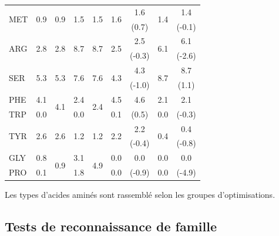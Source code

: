 \begin{table}
\begin{tabular}{lcccc|cccc}
\hline                                                                        
\multirow{2}{*}{MET}&\multirow{2}{*}{0.9}&\multirow{2}{*}{0.9}&\multirow{2}{*}{1.5}&\multirow{2}{*}{1.5}&\multirow{2}{*}{1.6}&1.6&\multirow{2}{*}{1.4}&1.4\\
&&&&&&(0.7)&&(-0.1)\\
\hline                                                                         
\multirow{2}{*}{ARG}&\multirow{2}{*}{2.8}&\multirow{2}{*}{2.8}&\multirow{2}{*}{8.7}&\multirow{2}{*}{8.7}&\multirow{2}{*}{2.5}&2.5&\multirow{2}{*}{6.1}&6.1\\
&&&&&&(-0.3)&&(-2.6)\\
\hline                                                                                  
\multirow{2}{*}{SER} &\multirow{2}{*}{5.3}&\multirow{2}{*}{5.3}&\multirow{2}{*}{7.6}&\multirow{2}{*}{7.6}&\multirow{2}{*}{4.3}&4.3&\multirow{2}{*}{8.7}&8.7\\
&&&&&&(-1.0)&&(1.1)\\
\hline                                                         
PHE      &4.1&\multirow{2}{*}{4.1}&2.4&\multirow{2}{*}{2.4}&4.5&\multirow{1}{*}{4.6}&2.1&\multirow{1}{*}{2.1}\\
TRP&0.0&&0.0&&0.1&(0.5)&0.0&(-0.3)\\
\hline                                                                                                                                                                                   
\multirow{2}{*}{TYR}&\multirow{2}{*}{2.6}&\multirow{2}{*}{2.6}&\multirow{2}{*}{1.2}&\multirow{2}{*}{1.2}&\multirow{2}{*}{2.2}&2.2&\multirow{2}{*}{0.4}&0.4\\
&&&&&&(-0.4)&&(-0.8)\\
\hline                                                                                                                                                                            
GLY&0.8&\multirow{2}{*}{0.9}&3.1&\multirow{2}{*}{4.9}&0.0&\multirow{1}{*}{0.0}&0.0&\multirow{1}{*}{0.0}\\
PRO&0.1&&1.8&&0.0&(-0.9)&0.0&(-4.9)\\
\hline
\end{tabular}
{\footnotesize Les types d'acides aminés sont rassemblé selon les groupes d'optimisations.}
\label{Tab:FreqAA6}
\end{table}



\subsection{Tests de reconnaissance de famille}

